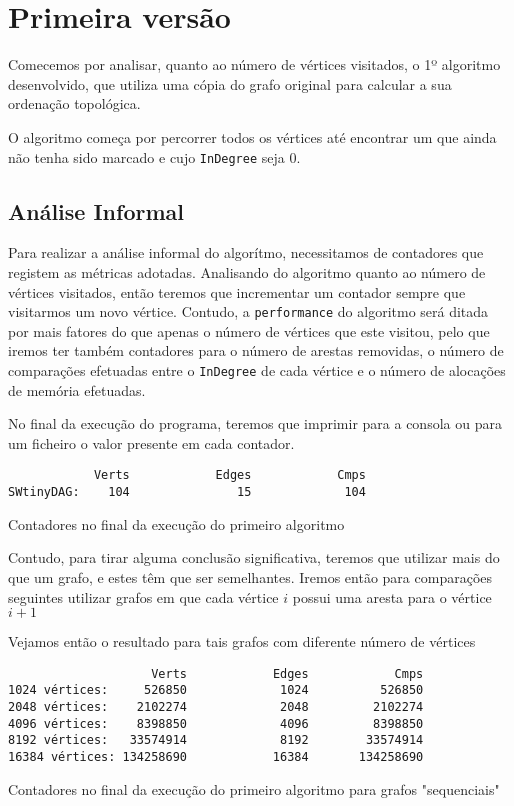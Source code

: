 \chapter{Primeira versão}
Comecemos por analisar, quanto ao número de vértices visitados, o 1º algoritmo desenvolvido, que utiliza
uma cópia do grafo original para calcular a sua ordenação
topológica.

O algoritmo começa por percorrer todos os vértices até encontrar
um que ainda não tenha sido marcado e cujo \verb|InDegree| seja
0.


\section{Análise Informal}

Para realizar a análise informal do algorítmo, necessitamos de
contadores que registem as métricas adotadas. Analisando do
algoritmo quanto ao número de vértices visitados, então teremos
que incrementar um contador sempre que visitarmos um novo
vértice. Contudo, a \verb|performance| do algoritmo será ditada
por mais fatores do que apenas o número de vértices que este
visitou, pelo que iremos ter também contadores para o número de
arestas removidas, o número de comparações efetuadas entre o
\verb|InDegree| de cada vértice e o número de alocações de
memória efetuadas.

No final da execução do programa, teremos que imprimir para a
consola ou para um ficheiro o valor presente em cada contador.

\begin{listing}[H]
	\centering
	\begin{verbatim}
            Verts	         Edges	          Cmps
SWtinyDAG:    104	            15	           104
  \end{verbatim}
	\caption{Contadores no final da execução do primeiro algoritmo}
\end{listing}

Contudo, para tirar alguma conclusão significativa, teremos que
utilizar mais do que um grafo, e estes têm que ser semelhantes.
Iremos então para comparações seguintes utilizar grafos em que
cada vértice $i$ possui uma aresta para o vértice $i+1$


Vejamos então o resultado para tais grafos com diferente número
de vértices

\begin{listing}[H]
	\centering
	\begin{verbatim}
                    Verts	         Edges	          Cmps
1024 vértices:     526850	          1024	        526850
2048 vértices:    2102274	          2048	       2102274
4096 vértices:    8398850	          4096	       8398850
8192 vértices:   33574914	          8192	      33574914
16384 vértices: 134258690	         16384	     134258690
  \end{verbatim}
	\caption{Contadores no final da execução do primeiro algoritmo
		para grafos "sequenciais"}
\end{listing}

